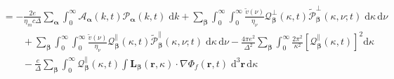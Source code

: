 \documentclass{article}
\begin{document}
\begin{equation}
\begin{split}
&= -\frac{2e}{\eta_mc\Delta}\sum_{\bm{\alpha}}\int_0^\infty\mathcal{A}_{\bm{\alpha}}(k,t)\mathcal{P}_{\bm{\alpha}}(k,t)\;\mathrm{d}k + \sum_{\bm{\beta}}\int_0^\infty\int_0^\infty\frac{\tilde{v}(\nu)}{\eta_\nu}\mathcal{Q}_{\bm{\beta}}^\perp(\kappa,t)\tilde{\mathcal{P}}_{\bm{\beta}}^\perp(\kappa,\nu;t)\;\mathrm{d}\kappa\,\mathrm{d}\nu\\
&\qquad + \sum_{\bm{\beta}}\int_0^\infty\int_0^\infty\frac{\tilde{v}(\nu)}{\eta_\nu}\mathcal{Q}_{\bm{\beta}}^\parallel(\kappa,t)\tilde{\mathcal{P}}_{\bm{\beta}}^\parallel(\kappa,\nu;t)\;\mathrm{d}\kappa\,\mathrm{d}\nu - \frac{4\pi e^2}{\Delta^2}\sum_{\bm{\beta}}\int_0^\infty\frac{2\pi^2}{\kappa^2}\left[\mathcal{Q}_{\bm{\beta}}^\parallel(\kappa,t)\right]^2\mathrm{d}\kappa\\
&\qquad - \frac{e}{\Delta}\sum_{\bm{\beta}}\int_0^\infty\mathcal{Q}_{\bm{\beta}}^\parallel(\kappa,t)\int\mathbf{L}_{\bm{\beta}}(\mathbf{r},\kappa)\cdot\nabla\Phi_f(\mathbf{r},t)\;\mathrm{d}^3\mathbf{r}\,\mathrm{d}\kappa
\end{split}
\end{equation}
\end{document}
